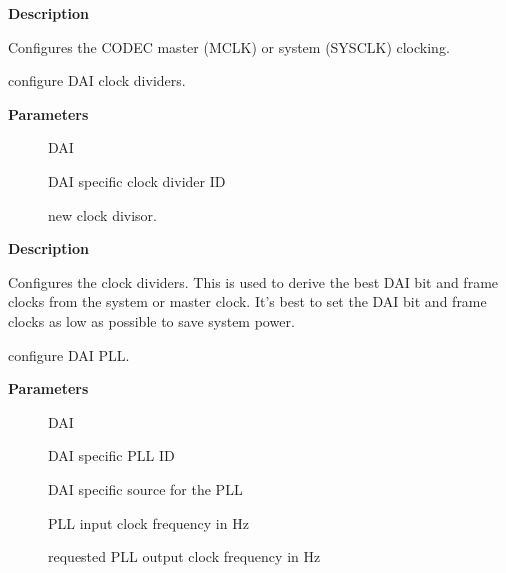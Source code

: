 \documentclass[a4paper,8pt,english]{sphinxmanual}
\begin{document}
\textbf{Description}

Configures the CODEC master (MCLK) or system (SYSCLK) clocking.

\begin{fulllineitems}
\label{sound/kernel-api/alsa-driver-api:c.snd_soc_dai_set_clkdiv}
configure DAI clock dividers.

\end{fulllineitems}


\textbf{Parameters}
\begin{description}
\item[{}] \leavevmode
DAI

\item[{}] \leavevmode
DAI specific clock divider ID

\item[{}] \leavevmode
new clock divisor.

\end{description}

\textbf{Description}

Configures the clock dividers. This is used to derive the best DAI bit and
frame clocks from the system or master clock. It's best to set the DAI bit
and frame clocks as low as possible to save system power.

\begin{fulllineitems}
\label{sound/kernel-api/alsa-driver-api:c.snd_soc_dai_set_pll}
configure DAI PLL.

\end{fulllineitems}


\textbf{Parameters}
\begin{description}
\item[{}] \leavevmode
DAI

\item[{}] \leavevmode
DAI specific PLL ID

\item[{}] \leavevmode
DAI specific source for the PLL

\item[{}] \leavevmode
PLL input clock frequency in Hz

\item[{}] \leavevmode
requested PLL output clock frequency in Hz

\end{description}
\end{document}
